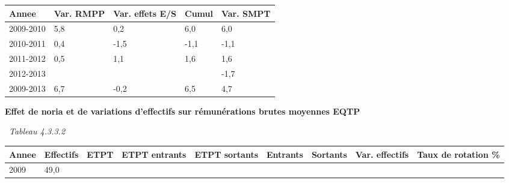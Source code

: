\begin{longtable}[]{@{}lllll@{}}
\toprule
Annee & Var. RMPP & Var. effets E/S & Cumul & Var. SMPT\tabularnewline
\midrule
\endhead
2009-2010 & 5,8 & 0,2 & 6,0 & 6,0\tabularnewline
2010-2011 & 0,4 & -1,5 & -1,1 & -1,1\tabularnewline
2011-2012 & 0,5 & 1,1 & 1,6 & 1,6\tabularnewline
2012-2013 & & & & -1,7\tabularnewline
2009-2013 & 6,7 & -0,2 & 6,5 & 4,7\tabularnewline
\bottomrule
\end{longtable}

\textbf{Effet de noria et de variations d'effectifs sur rémunérations
brutes moyennes EQTP}

~\emph{Tableau 4.3.3.2}

\begin{longtable}[]{@{}lllllllll@{}}
\toprule
\begin{minipage}[b]{0.05\columnwidth}\raggedright
Annee\strut
\end{minipage} & \begin{minipage}[b]{0.08\columnwidth}\raggedright
Effectifs\strut
\end{minipage} & \begin{minipage}[b]{0.04\columnwidth}\raggedright
ETPT\strut
\end{minipage} & \begin{minipage}[b]{0.10\columnwidth}\raggedright
ETPT entrants\strut
\end{minipage} & \begin{minipage}[b]{0.10\columnwidth}\raggedright
ETPT sortants\strut
\end{minipage} & \begin{minipage}[b]{0.07\columnwidth}\raggedright
Entrants\strut
\end{minipage} & \begin{minipage}[b]{0.07\columnwidth}\raggedright
Sortants\strut
\end{minipage} & \begin{minipage}[b]{0.11\columnwidth}\raggedright
Var. effectifs\strut
\end{minipage} & \begin{minipage}[b]{0.14\columnwidth}\raggedright
Taux de rotation \%\strut
\end{minipage}\tabularnewline
\midrule
\endhead
\begin{minipage}[t]{0.05\columnwidth}\raggedright
2009\strut
\end{minipage} & \begin{minipage}[t]{0.08\columnwidth}\raggedright
49,0\strut
\end{minipage} & \begin{minipage}[t]{0.04\columnwidth}\raggedright

\end{minipage}
\end{longtable}
